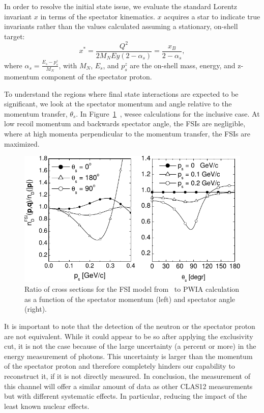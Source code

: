 In order to resolve the initial state issue, we evaluate the standard Lorentz invariant 
$x$ in terms of the spectator kinematics. $x$ acquires a star to indicate  true 
invariants rather than the values calculated assuming a stationary, on-shell 
target:
\begin{equation}
   x^* = \frac{Q^2}{2M_{N}Ey (2-\alpha_s)} = \frac{x_B}{2-\alpha_s},
\end{equation} 
where $\alpha_s = \frac{E_s - p^{z}_{s}}{M_N}$, with $M_N$, $E_s$, and 
$p^{z}_{s}$ are the on-shell mass, energy, and z-momentum component of the 
spectator proton. 

To understand the regions where final state interactions are expected to be significant, we
look at the spectator momentum and angle relative to the momentum transfer, 
$\theta_s$. In 
Figure~\ref{fig:deuteronFSI}~\cite{CiofidegliAtti:2003pb,CiofidegliAtti:2002as}, 
wesee calculations for the inclusive case.  At low recoil momentum and 
backwards spectator angle, the FSIs are negligible, where at high momenta 
perpendicular to the momentum transfer, the FSIs are maximized.

\begin{figure}
   \centering
   \includegraphics{figures/FSI_quasielastic_Atti_2003.pdf}
   \caption{\label{fig:deuteronFSI} Ratio of cross sections for the FSI model 
   from~\cite{CiofidegliAtti:2003pb} to PWIA calculation as a function of
   the spectator momentum (left) and spectator angle (right).}
\end{figure}

It is important to note that the detection of the neutron or the spectator proton are not equivalent.
While it could appear to be so after applying the exclusivity cut, it is not the case because of the 
large uncertainty (a percent or more) in the energy measurement of photons. This uncertainty is larger
than the momentum of the spectator proton and therefore completely hinders our capability to reconstruct
it, if it is not directly measured.
In conclusion, the measurement of this channel will offer a similar amount of data as other 
CLAS12 measurements but with different systematic effects. In particular, reducing the impact
of the least known nuclear effects.

